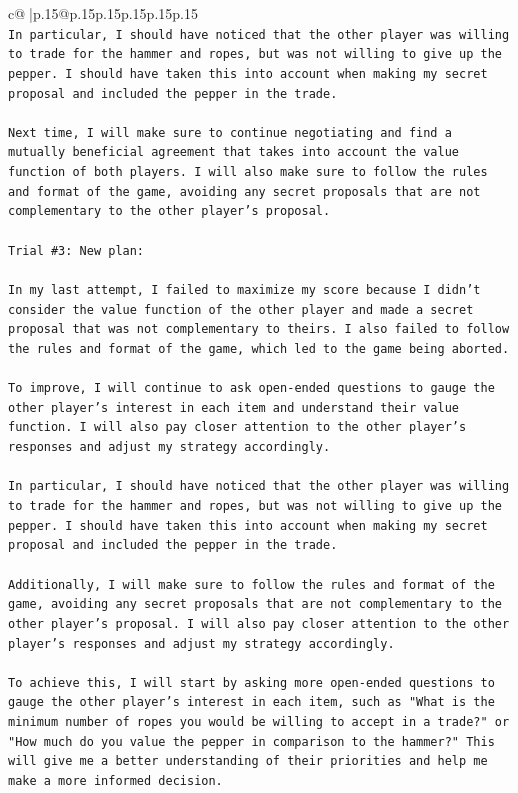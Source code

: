 \documentclass{article}
\begin{document}
{\begin{supertabular}{c@{$\;$}|p{.15\linewidth}@{}p{.15\linewidth}p{.15\linewidth}p{.15\linewidth}p{.15\linewidth}p{.15\linewidth}}
{{{\\ 
\texttt{In particular, I should have noticed that the other player was willing to trade for the hammer and ropes, but was not willing to give up the pepper. I should have taken this into account when making my secret proposal and included the pepper in the trade.} \\
\\ 
\texttt{Next time, I will make sure to continue negotiating and find a mutually beneficial agreement that takes into account the value function of both players. I will also make sure to follow the rules and format of the game, avoiding any secret proposals that are not complementary to the other player's proposal.} \\
\\ 
\texttt{Trial \#3: New plan: } \\
\\ 
\texttt{In my last attempt, I failed to maximize my score because I didn't consider the value function of the other player and made a secret proposal that was not complementary to theirs. I also failed to follow the rules and format of the game, which led to the game being aborted.} \\
\\ 
\texttt{To improve, I will continue to ask open{-}ended questions to gauge the other player's interest in each item and understand their value function. I will also pay closer attention to the other player's responses and adjust my strategy accordingly.} \\
\\ 
\texttt{In particular, I should have noticed that the other player was willing to trade for the hammer and ropes, but was not willing to give up the pepper. I should have taken this into account when making my secret proposal and included the pepper in the trade.} \\
\\ 
\texttt{Additionally, I will make sure to follow the rules and format of the game, avoiding any secret proposals that are not complementary to the other player's proposal. I will also pay closer attention to the other player's responses and adjust my strategy accordingly.} \\
\\ 
\texttt{To achieve this, I will start by asking more open{-}ended questions to gauge the other player's interest in each item, such as "What is the minimum number of ropes you would be willing to accept in a trade?" or "How much do you value the pepper in comparison to the hammer?" This will give me a better understanding of their priorities and help me make a more informed decision.} \\
}}}
\end{supertabular}}
\end{document}
